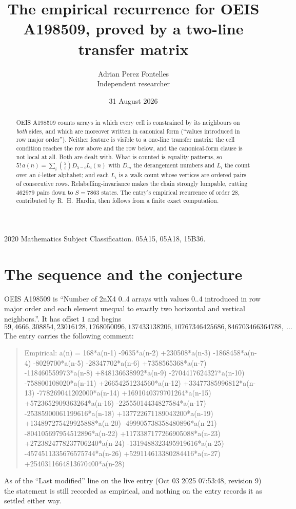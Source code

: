 \documentclass[11pt,a4paper]{article}
\title{The empirical recurrence for OEIS A198509, proved by a two-line transfer matrix}
\author{Adrian Perez Fontelles\\ \small Independent researcher}
\date{31 August 2026}
\theoremstyle{plain}
\theoremstyle{definition}
\begin{document}
\maketitle

\begin{abstract}
OEIS A198509 counts arrays in which every cell is constrained by its neighbours on \emph{both}
sides, and which are moreover written in canonical form (``values introduced in row major
order''). Neither feature is visible to a one-line transfer matrix: the cell condition
reaches the row above and the row below, and the canonical-form clause is not local at
all. Both are dealt with. What is counted is equality patterns, so
$5!\,a(n)=\sum_i\binom{5}{i}D_{5-i}L_i(n)$ with $D_m$ the derangement numbers and
$L_i$ the count over an $i$-letter alphabet; and each $L_i$ is a walk count whose vertices
are ordered pairs of consecutive rows. Relabelling-invariance makes the chain strongly
lumpable, cutting $462979$ pairs down to $S=7863$ states. The entry's empirical recurrence of
order $28$, contributed by R.~H.~Hardin, then follows from a finite exact computation.
\end{abstract}

\noindent\small 2020 Mathematics Subject Classification. 05A15, 05A18, 15B36.\normalsize

\section{The sequence and the conjecture}

OEIS A198509 is ``Number of 2nX4 0..4 arrays with values 0..4 introduced in row major order and each element unequal to exactly two horizontal and vertical neighbors.''. It has offset $1$ and begins
\[
59, 4666, 308854, 23016128, 1768050096, 137433138206, 10767346425686, 846703466364788,\ \dots
\]
The entry carries the following comment:
\begin{quote}\small
Empirical: a(n) = 168*a(n-1) -9635*a(n-2) +230508*a(n-3) -1868458*a(n-4) -8029700*a(n-5) -28347702*a(n-6) +7358565368*a(n-7) -118460559973*a(n-8) +848136638992*a(n-9) -2704417624327*a(n-10) -758800108020*a(n-11) +26654251234560*a(n-12) +33477385996812*a(n-13) -778269041202000*a(n-14) +1691040379701264*a(n-15) +5723652909363264*a(n-16) -22555014434827584*a(n-17) -25385900061199616*a(n-18) +137722671189043200*a(n-19) +134897275429925888*a(n-20) -499905738358480896*a(n-21) -804105697954512896*a(n-22) +1173387177266905088*a(n-23) +2723824778237706240*a(n-24) -1319488323495919616*a(n-25) -4574511335676575744*a(n-26) +529114613380284416*a(n-27) +2540311664813670400*a(n-28)
\end{quote}
As of the ``Last modified'' line on the live entry (Oct 03 2025 07:53:48, revision 9) the statement is
still recorded as empirical, and nothing on the entry records it as settled either way.
\end{document}
